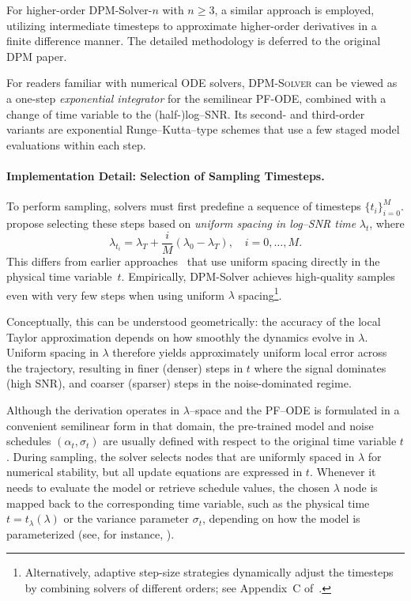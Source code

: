 For higher-order DPM-Solver-$n$ with $n \geq 3$, a similar approach is employed, utilizing intermediate timesteps to approximate higher-order derivatives in a finite difference manner. The detailed methodology is deferred to the original DPM paper.


For readers familiar with numerical ODE solvers, \textsc{DPM-Solver} can be viewed as a 
one-step \emph{exponential integrator} for the semilinear PF-ODE, combined with a change of 
time variable to the (half-)log–SNR. Its second- and third-order variants are exponential 
Runge--Kutta–type schemes that use a few staged model evaluations within each step.


\paragraph{Implementation Detail: Selection of Sampling Timesteps.} To perform sampling, solvers must first predefine a sequence of timesteps $\{t_i\}_{i=0}^M$.  
\citet{lu2022dpm} propose selecting these steps based on \emph{uniform spacing in log–SNR time} $\lambda_t$, where
\[
\lambda_{t_i} = \lambda_T + \frac{i}{M}(\lambda_0 - \lambda_T), \quad i = 0, \dots, M.
\]
This differs from earlier approaches~\citep{ho2020denoising,song2020score} that use uniform spacing directly in the physical time variable~$t$.  
Empirically, DPM-Solver achieves high-quality samples even with very few steps when using uniform $\lambda$ spacing\footnote{Alternatively, adaptive step-size strategies dynamically adjust the timesteps by combining solvers of different orders; see Appendix~C of~\citet{lu2022dpm}.}.

Conceptually, this can be understood geometrically: the accuracy of the local Taylor approximation depends on how smoothly the dynamics evolve in $\lambda$.  
Uniform spacing in $\lambda$ therefore yields approximately uniform local error across the trajectory, resulting in finer (denser) steps in $t$ where the signal dominates (high SNR), and coarser (sparser) steps in the noise-dominated regime.  



Although the derivation operates in $\lambda$–space and the PF–ODE is formulated in a convenient semilinear form in that domain, the pre-trained model and noise schedules $(\alpha_t, \sigma_t)$ are usually defined with respect to the original time variable $t$.  
During sampling, the solver selects nodes that are uniformly spaced in $\lambda$ for numerical stability, but all update equations are expressed in $t$.  
Whenever it needs to evaluate the model or retrieve schedule values, the chosen $\lambda$ node is mapped back to the corresponding time variable, such as the physical time $t = t_\lambda(\lambda)$ or the variance parameter $\sigma_t$, depending on how the model is parameterized (see, for instance, ).  











